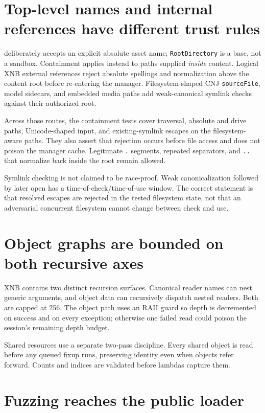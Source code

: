 \section{Top-level names and internal references have different trust rules}

 deliberately accepts an explicit absolute asset name;
\texttt{RootDirectory} is a base, not a sandbox. Containment applies instead to paths supplied
\emph{inside} content. Logical XNB external references reject absolute spellings and normalization
above the content root before re-entering the manager. Filesystem-shaped CNJ \texttt{sourceFile},
model sidecars, and embedded media paths add weak-canonical symlink checks against their
authorized root.

Across those routes, the containment tests cover traversal, absolute and drive paths,
Unicode-shaped input, and existing-symlink escapes on the filesystem-aware paths. They also assert
that rejection occurs before file access and does not poison the manager cache. Legitimate
\texttt{.} segments, repeated separators, and \texttt{..} that normalize back inside the root
remain allowed.

Symlink checking is not claimed to be race-proof.  Weak canonicalization followed by later open
has a time-of-check/time-of-use window.  The correct statement is that resolved escapes are
rejected in the tested filesystem state, not that an adversarial concurrent filesystem cannot
change between check and use.

\section{Object graphs are bounded on both recursive axes}

XNB contains two distinct recursion surfaces.  Canonical reader names can nest generic
arguments, and object data can recursively dispatch nested readers.  Both are capped at 256.
The object path uses an RAII guard so depth is decremented on success and on every exception;
otherwise one failed read could poison the session's remaining depth budget.

Shared resources use a separate two-pass discipline.  Every shared object is read before any
queued fixup runs, preserving identity even when objects refer forward.  Counts and indices are
validated before lambdas capture them.

\section{Fuzzing reaches the public loader}

